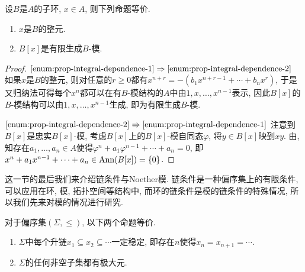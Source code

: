 \begin{proposition}\label{prop:integraldependence}
  设$B$是$A$的子环, $x\in A$, 则下列命题等价.
  \begin{enumerate}
    \item\label{enum:prop-integral-dependence-1} $x$是$B$的整元.
    \item\label{enum:prop-integral-dependence-2} $B[x]$是有限生成$B$-模.
  \end{enumerate}
\end{proposition}

\begin{proof}
  $\ref{enum:prop-integral-dependence-1}\Rightarrow\ref{enum:prop-integral-dependence-2}$ 如果$x$是$B$的整元, 则对任意的$r\geq 0$都有$x^{n+r}=-(b_1x^{n+r-1}+\dotsb +b_nx^r)$, 于是又归纳法可得每个$x^n$都可以在有$B$-模结构的$A$中由$1, x, \dotsc, x^{n-1}$表示, 因此$B[x]$的$B$-模结构可以由$1, x, \dotsc, x^{n-1}$生成, 即为有限生成$B$-模.

  $\ref{enum:prop-integral-dependence-2}\Rightarrow\ref{enum:prop-integral-dependence-1}$ 注意到$B[x]$是忠实$B[x]$-模, 考虑$B[x]$上的$B[x]$-模自同态$\varphi$, 将$y\in B[x]$映到$xy$. 由, 知存在$a_1, \dotsc, a_n\in A$使得$\varphi^n +a_1\varphi^{n-1}+\dotsb +a_n=0$, 即$x^n +a_1x^{n-1}+\dotsb +a_n\in \operatorname{Ann} (B[x])=\{0\}$.
\end{proof}


这一节的最后我们来介绍链条件与Noether模. 链条件是一种偏序集上的有限条件, 可以应用在环, 模, 拓扑空间等结构中, 而环的链条件是模的链条件的特殊情况, 所以我们先来对模的情况进行研究.

\begin{proposition}\label{prop:chaincondition}
  对于偏序集$(\Sigma, \leq)$, 以下两个命题等价.
  \begin{enumerate}
    \item\label{enum:prop-chain-condition-chain} $\Sigma$中每个升链$x_1\subseteq x_2\subseteq\dotsb$一定稳定, 即存在$n$使得$x_n=x_{n+1}=\dotsb$.
    \item\label{enum:prop-chain-condition-maximal} $\Sigma$的任何非空子集都有极大元.
  \end{enumerate}
\end{proposition}


